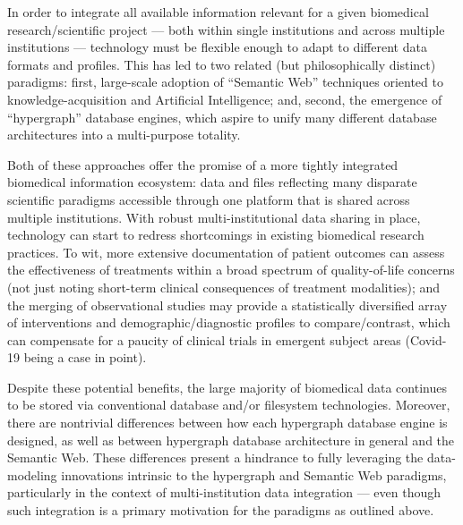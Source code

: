 \documentclass[12pt,letterpaper]{article}
\newcommand{\p}[1]{

\vspace{.7em}#1}
\newcommand{\q}[1]{{\fontfamily{qcr}\selectfont ``}#1{\fontfamily{qcr}\selectfont ''}}
\begin{document}
{\p{In order to integrate all available information relevant 
for a given biomedical research/scientific project --- both within single
institutions and across multiple institutions --- technology must be 
flexible enough to adapt to different data formats and profiles.  This has led to 
two related (but philosophically distinct) paradigms: first, large-scale 
adoption of \q{Semantic Web} techniques oriented to knowledge-acquisition and 
Artificial Intelligence; and, second, the emergence of 
\q{hypergraph} database engines, which aspire to unify many different 
database architectures into a multi-purpose totality.}

\p{Both 
of these approaches offer the promise of a more tightly integrated 
biomedical information ecosystem: data and files reflecting many 
disparate scientific paradigms accessible through one 
platform that is shared across multiple institutions.  With robust 
multi-institutional data sharing in place, technology  
can start to redress shortcomings in existing biomedical research 
practices.  To wit, more extensive documentation of patient 
outcomes can assess the effectiveness of treatments within a broad 
spectrum of quality-of-life concerns (not just noting short-term clinical 
consequences of treatment modalities); and the 
merging of observational studies may provide a statistically 
diversified array of interventions and demographic/diagnostic profiles 
to compare/contrast, which can compensate for a paucity of clinical trials 
in emergent subject areas (Covid-19 being a case in point).}

\p{Despite these potential benefits, the large majority of biomedical 
data continues to be stored via conventional database 
and/or filesystem technologies.  Moreover, there are nontrivial 
differences between how each hypergraph database engine is designed, 
as well as between hypergraph database architecture in general and the 
Semantic Web.  These differences present a hindrance to 
fully leveraging the data-modeling innovations intrinsic to the 
hypergraph and Semantic Web paradigms, particularly in the context 
of multi-institution data integration --- even though 
such integration is a primary motivation for the paradigms 
as outlined above.} 

}
\end{document}
